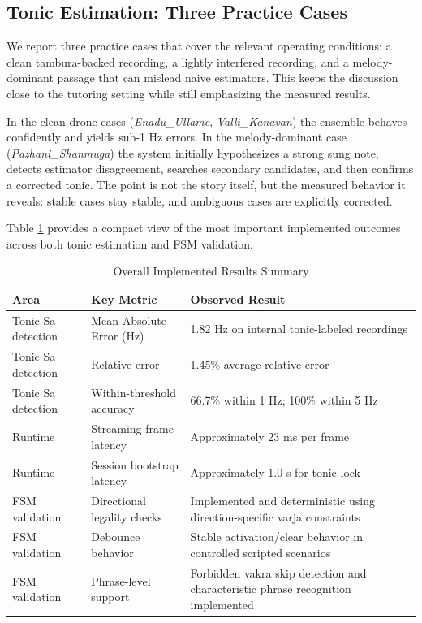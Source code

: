 \documentclass{ieeeaccess}
\begin{document}
\subsection{Tonic Estimation: Three Practice Cases}
We report three practice cases that cover the relevant operating conditions: a clean tambura-backed recording, a lightly interfered recording, and a melody-dominant passage that can mislead naive estimators. This keeps the discussion close to the tutoring setting while still emphasizing the measured results.

In the clean-drone cases (\textit{Enadu\_Ullame}, \textit{Valli\_Kanavan}) the ensemble behaves confidently and yields sub-1 Hz errors. In the melody-dominant case (\textit{Pazhani\_Shanmuga}) the system initially hypothesizes a strong sung note, detects estimator disagreement, searches secondary candidates, and then confirms a corrected tonic. The point is not the story itself, but the measured behavior it reveals: stable cases stay stable, and ambiguous cases are explicitly corrected.

Table \ref{tab:overall_summary} provides a compact view of the most important implemented outcomes across both tonic estimation and FSM validation.

\begin{table}[ht]
\caption{Overall Implemented Results Summary}
\label{tab:overall_summary}
\centering
\setlength{\tabcolsep}{3pt}
\begin{tabular}{p{1.4cm}p{2.3cm}p{4.3cm}}
\toprule
Area & Key Metric & Observed Result \\
\midrule
Tonic Sa detection & Mean Absolute Error (Hz) & 1.82 Hz on internal tonic-labeled recordings \\
Tonic Sa detection & Relative error & 1.45\% average relative error \\
Tonic Sa detection & Within-threshold accuracy & 66.7\% within 1 Hz; 100\% within 5 Hz \\
Runtime & Streaming frame latency & Approximately 23 ms per frame \\
Runtime & Session bootstrap latency & Approximately 1.0 s for tonic lock \\
FSM validation & Directional legality checks & Implemented and deterministic using direction-specific varja constraints \\
FSM validation & Debounce behavior & Stable activation/clear behavior in controlled scripted scenarios \\
FSM validation & Phrase-level support & Forbidden vakra skip detection and characteristic phrase recognition implemented \\
\bottomrule
\end{tabular}
\end{table}
\vspace{14pt}
\FloatBarrier
\end{document}
